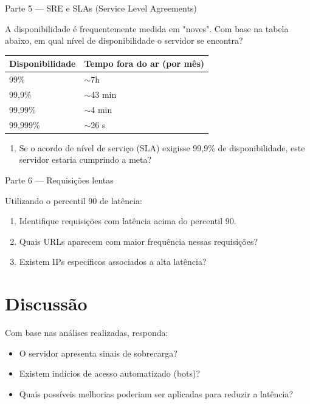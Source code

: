 \documentclass[12pt]{article}
\begin{document}
\begin{block}{Parte 5 — SRE e SLAs (Service Level Agreements)}

A disponibilidade é frequentemente medida em "noves". Com base na tabela abaixo, em qual nível de disponibilidade o servidor se encontra?

\begin{center}
\begin{tabular}{|l|l|}
\hline
\textbf{Disponibilidade} & \textbf{Tempo fora do ar (por mês)} \\ \hline
99\% & $\sim$7h \\ \hline
99,9\% & $\sim$43 min \\ \hline
99,99\% & $\sim$4 min \\ \hline
99,999\% & $\sim$26 s \\ \hline
\end{tabular}
\end{center}

\begin{enumerate}
\item Se o acordo de nível de serviço (SLA) exigisse 99,9\% de disponibilidade, este servidor estaria cumprindo a meta?
\end{enumerate}

\end{block}

\begin{block}{Parte 6 — Requisições lentas}

Utilizando o percentil 90 de latência:

\begin{enumerate}
\item Identifique requisições com latência acima do percentil 90.
\item Quais URLs aparecem com maior frequência nessas requisições?
\item Existem IPs específicos associados a alta latência?
\end{enumerate}

\vspace{1cm}

\end{block}

\section*{Discussão}

Com base nas análises realizadas, responda:

\begin{itemize}
\item O servidor apresenta sinais de sobrecarga?
\item Existem indícios de acesso automatizado (bots)?
\item Quais possíveis melhorias poderiam ser aplicadas para reduzir a latência?
\end{itemize}

\vspace{4cm}

\end{document}
